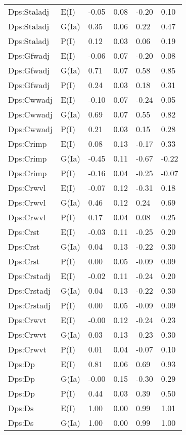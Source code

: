 \begin{center}
\begin{longtable}{|p{1.1in}|p{0.7in}|p{0.7in}|p{0.6in}|p{0.6in}|p{0.6in}|}
  Dps:Staladj & E(I) & -0.05 & 0.08 & -0.20 & 0.10 \\ 
  Dps:Staladj & G(Ia) & 0.35 & 0.06 & 0.22 & 0.47 \\ 
  Dps:Staladj & P(I) & 0.12 & 0.03 & 0.06 & 0.19 \\ 
  Dps:Gfwadj & E(I) & -0.06 & 0.07 & -0.20 & 0.08 \\ 
  Dps:Gfwadj & G(Ia) & 0.71 & 0.07 & 0.58 & 0.85 \\ 
  Dps:Gfwadj & P(I) & 0.24 & 0.03 & 0.18 & 0.31 \\ 
  Dps:Cwwadj & E(I) & -0.10 & 0.07 & -0.24 & 0.05 \\ 
  Dps:Cwwadj & G(Ia) & 0.69 & 0.07 & 0.55 & 0.82 \\ 
  Dps:Cwwadj & P(I) & 0.21 & 0.03 & 0.15 & 0.28 \\ 
  Dps:Crimp & E(I) & 0.08 & 0.13 & -0.17 & 0.33 \\ 
  Dps:Crimp & G(Ia) & -0.45 & 0.11 & -0.67 & -0.22 \\ 
  Dps:Crimp & P(I) & -0.16 & 0.04 & -0.25 & -0.07 \\ 
  Dps:Crwvl & E(I) & -0.07 & 0.12 & -0.31 & 0.18 \\ 
  Dps:Crwvl & G(Ia) & 0.46 & 0.12 & 0.24 & 0.69 \\ 
  Dps:Crwvl & P(I) & 0.17 & 0.04 & 0.08 & 0.25 \\ 
  Dps:Crst & E(I) & -0.03 & 0.11 & -0.25 & 0.20 \\ 
  Dps:Crst & G(Ia) & 0.04 & 0.13 & -0.22 & 0.30 \\ 
  Dps:Crst & P(I) & 0.00 & 0.05 & -0.09 & 0.09 \\ 
  Dps:Crstadj & E(I) & -0.02 & 0.11 & -0.24 & 0.20 \\ 
  Dps:Crstadj & G(Ia) & 0.04 & 0.13 & -0.22 & 0.30 \\ 
  Dps:Crstadj & P(I) & 0.00 & 0.05 & -0.09 & 0.09 \\ 
  Dps:Crwvt & E(I) & -0.00 & 0.12 & -0.24 & 0.23 \\ 
  Dps:Crwvt & G(Ia) & 0.03 & 0.13 & -0.23 & 0.30 \\ 
  Dps:Crwvt & P(I) & 0.01 & 0.04 & -0.07 & 0.10 \\ 
  Dps:Dp & E(I) & 0.81 & 0.06 & 0.69 & 0.93 \\ 
  Dps:Dp & G(Ia) & -0.00 & 0.15 & -0.30 & 0.29 \\ 
  Dps:Dp & P(I) & 0.44 & 0.03 & 0.39 & 0.50 \\ 
  Dps:Ds & E(I) & 1.00 & 0.00 & 0.99 & 1.01 \\ 
  Dps:Ds & G(Ia) & 1.00 & 0.00 & 0.99 & 1.00 \\ 

\end{longtable}
\end{center}
